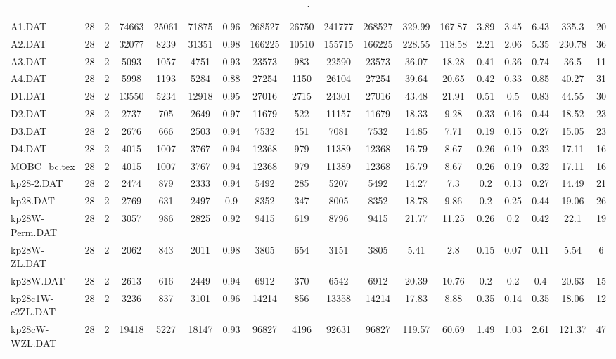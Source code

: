 \begin{sidewaystable}[h]
{\begin{tabular}{lccccccccccccccccc}
A1.DAT & 28 & 2 & 74663 & 25061 & 71875 & 0.96 & 268527 & 26750 & 241777 & 268527 & 329.99 & 167.87 & 3.89 & 3.45 & 6.43 & 335.3 & 20\\
A2.DAT & 28 & 2 & 32077 & 8239 & 31351 & 0.98 & 166225 & 10510 & 155715 & 166225 & 228.55 & 118.58 & 2.21 & 2.06 & 5.35 & 230.78 & 36\\
A3.DAT & 28 & 2 & 5093 & 1057 & 4751 & 0.93 & 23573 & 983 & 22590 & 23573 & 36.07 & 18.28 & 0.41 & 0.36 & 0.74 & 36.5 & 11\\
A4.DAT & 28 & 2 & 5998 & 1193 & 5284 & 0.88 & 27254 & 1150 & 26104 & 27254 & 39.64 & 20.65 & 0.42 & 0.33 & 0.85 & 40.27 & 31\\
D1.DAT & 28 & 2 & 13550 & 5234 & 12918 & 0.95 & 27016 & 2715 & 24301 & 27016 & 43.48 & 21.91 & 0.51 & 0.5 & 0.83 & 44.55 & 30\\
D2.DAT & 28 & 2 & 2737 & 705 & 2649 & 0.97 & 11679 & 522 & 11157 & 11679 & 18.33 & 9.28 & 0.33 & 0.16 & 0.44 & 18.52 & 23\\
D3.DAT & 28 & 2 & 2676 & 666 & 2503 & 0.94 & 7532 & 451 & 7081 & 7532 & 14.85 & 7.71 & 0.19 & 0.15 & 0.27 & 15.05 & 23\\
D4.DAT & 28 & 2 & 4015 & 1007 & 3767 & 0.94 & 12368 & 979 & 11389 & 12368 & 16.79 & 8.67 & 0.26 & 0.19 & 0.32 & 17.11 & 16\\
MOBC\_bc.tex & 28 & 2 & 4015 & 1007 & 3767 & 0.94 & 12368 & 979 & 11389 & 12368 & 16.79 & 8.67 & 0.26 & 0.19 & 0.32 & 17.11 & 16\\
kp28-2.DAT & 28 & 2 & 2474 & 879 & 2333 & 0.94 & 5492 & 285 & 5207 & 5492 & 14.27 & 7.3 & 0.2 & 0.13 & 0.27 & 14.49 & 21\\
kp28.DAT & 28 & 2 & 2769 & 631 & 2497 & 0.9 & 8352 & 347 & 8005 & 8352 & 18.78 & 9.86 & 0.2 & 0.25 & 0.44 & 19.06 & 26\\
kp28W-Perm.DAT & 28 & 2 & 3057 & 986 & 2825 & 0.92 & 9415 & 619 & 8796 & 9415 & 21.77 & 11.25 & 0.26 & 0.2 & 0.42 & 22.1 & 19\\
kp28W-ZL.DAT & 28 & 2 & 2062 & 843 & 2011 & 0.98 & 3805 & 654 & 3151 & 3805 & 5.41 & 2.8 & 0.15 & 0.07 & 0.11 & 5.54 & 6\\
kp28W.DAT & 28 & 2 & 2613 & 616 & 2449 & 0.94 & 6912 & 370 & 6542 & 6912 & 20.39 & 10.76 & 0.2 & 0.2 & 0.4 & 20.63 & 15\\
kp28c1W-c2ZL.DAT & 28 & 2 & 3236 & 837 & 3101 & 0.96 & 14214 & 856 & 13358 & 14214 & 17.83 & 8.88 & 0.35 & 0.14 & 0.35 & 18.06 & 12\\
kp28cW-WZL.DAT & 28 & 2 & 19418 & 5227 & 18147 & 0.93 & 96827 & 4196 & 92631 & 96827 & 119.57 & 60.69 & 1.49 & 1.03 & 2.61 & 121.37 & 47\\
\bottomrule
\end{tabular}%
}%
\caption{.}
\label{tab:table_bc}
\end{sidewaystable}

